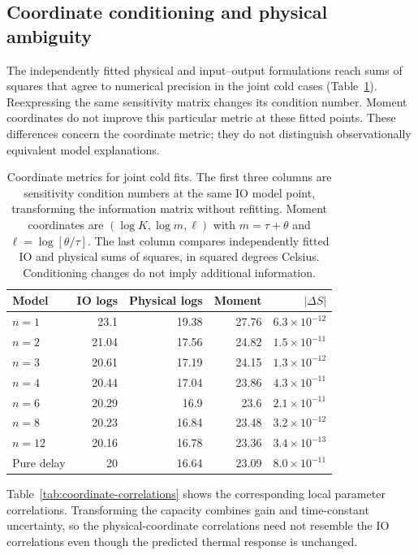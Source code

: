 \documentclass[11pt]{article}
\begin{document}
\subsection{Coordinate conditioning and physical ambiguity}
The independently fitted physical and input--output formulations reach sums of
squares that agree to numerical precision in the joint cold cases
(Table~\ref{tab:coordinate-metrics}). Reexpressing the same sensitivity matrix
changes its condition number. Moment coordinates do not improve this particular
metric at these fitted points. These differences concern the coordinate metric;
they do not distinguish observationally equivalent model explanations.

\begin{table}[tbp]
\centering
\small
\begin{tabular}{lrrrr}
\toprule
Model & IO logs & Physical logs & Moment & $|\Delta S|$ \\
\midrule
$n=1$ & 23.1 & 19.38 & 27.76 & $6.3\times10^{-12}$ \\
$n=2$ & 21.04 & 17.56 & 24.82 & $1.5\times10^{-11}$ \\
$n=3$ & 20.61 & 17.19 & 24.15 & $1.3\times10^{-12}$ \\
$n=4$ & 20.44 & 17.04 & 23.86 & $4.3\times10^{-11}$ \\
$n=6$ & 20.29 & 16.9 & 23.6 & $2.1\times10^{-11}$ \\
$n=8$ & 20.23 & 16.84 & 23.48 & $3.2\times10^{-12}$ \\
$n=12$ & 20.16 & 16.78 & 23.36 & $3.4\times10^{-13}$ \\
Pure delay & 20 & 16.64 & 23.09 & $8.0\times10^{-11}$ \\
\bottomrule
\end{tabular}
\caption{Coordinate metrics for joint cold fits. The first three columns are sensitivity condition numbers at the same IO model point, transforming the information matrix without refitting. Moment coordinates are $(\log K,\log m,\ell)$ with $m=\tau+\theta$ and $\ell=\log[\theta/\tau]$. The last column compares independently fitted IO and physical sums of squares, in squared degrees Celsius. Conditioning changes do not imply additional information.}
\label{tab:coordinate-metrics}
\end{table}


Table~\ref{tab:coordinate-correlations} shows the corresponding local parameter
correlations. Transforming the capacity combines gain and time-constant
uncertainty, so the physical-coordinate correlations need not resemble the IO
correlations even though the predicted thermal response is unchanged.
\end{document}
